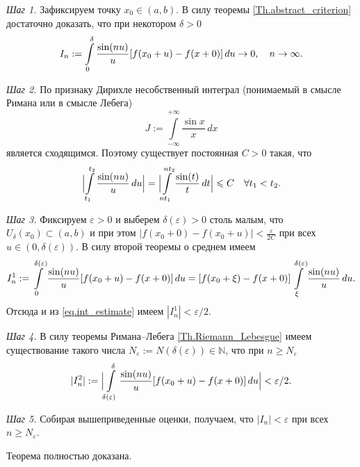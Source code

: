 \textit{Шаг 1.} Зафиксируем точку $x_{0} \in (a,b)$.
В силу теоремы \ref{Th.abstract_criterion} достаточно доказать, что при некотором $\delta > 0$
\begin{equation}
	\notag
	I_{n}:=\int\limits_{0}^{\delta}\frac{\sin(nu)}{u}[f(x_{0}+u)-f(x+0)]\,du \to 0, \quad n \to \infty.
\end{equation}


\textit{Шаг 2.} По признаку Дирихле несобственный интеграл (понимаемый в смысле Римана или в смысле Лебега)
$$
J:=\int\limits_{-\infty}^{+\infty}\frac{\sin x}{x}\,dx
$$
является сходящимся.
Поэтому существует постоянная $C > 0$ такая, что
\begin{equation}
	\label{eq.int_estimate}
	\Bigl|\int\limits_{t_{1}}^{t_{2}}\frac{\sin(nu)}{u}\,du\Bigr| = \Bigl|\int\limits_{nt_{1}}^{nt_{2}}\frac{\sin(t)}{t}\,dt\Bigr| \le C \quad \forall t_{1} < t_{2}.
\end{equation}

\textit{Шаг 3.} Фиксируем $\varepsilon > 0$ и выберем $\delta(\varepsilon) > 0$ столь малым, что $U_{\delta}(x_{0}) \subset (a,b)$ и при этом $|f(x_{0}+0)-f(x_{0}+u)| < \frac{\varepsilon}{2C}$
при всех $u \in (0,\delta(\varepsilon))$.
В силу второй теоремы о среднем имеем
\begin{equation}
	\notag
	I^{1}_{n}:=\int\limits_{0}^{\delta(\varepsilon)}\frac{\sin(nu)}{u}[f(x_{0}+u)-f(x+0)]\,du =
	[f(x_{0}+\xi)-f(x+0)]\int\limits_{\xi}^{\delta(\varepsilon)}\frac{\sin(nu)}{u}\,du.
\end{equation}
Отсюда и из \eqref{eq.int_estimate} имеем $|I_{n}^{1}| < \varepsilon/2$.


\textit{Шаг 4.} 
В силу теоремы Римана--Лебега \ref{Th.Riemann_Lebesgue} имеем существование такого числа $N_{\varepsilon}:=N(\delta(\varepsilon)) \in \mathbb{N}$, что при $n \geq N_{\varepsilon}$
\begin{equation}
	\notag
	|I_{n}^{2}|:=\Bigl|\int\limits_{\delta(\varepsilon)}^{\delta}\frac{\sin(nu)}{u}[f(x_{0}+u)-f(x+0)]\,du\Bigr| < \varepsilon/2.
\end{equation}

\textit{Шаг 5.} Собирая вышеприведенные оценки, получаем, что $|I_{n}| < \varepsilon$ при всех $n \geq N_{\varepsilon}$.

Теорема полностью доказана.



